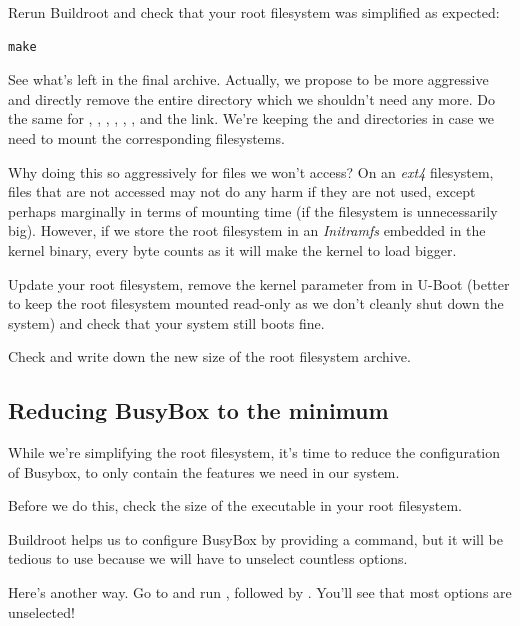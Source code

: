 Rerun Buildroot and check that your root filesystem was simplified as
expected:

\begin{verbatim}
make
\end{verbatim}

See what's left in the final archive. Actually, we propose to be more
aggressive and directly remove the entire  directory which we
shouldn't need any more. Do the same for , ,
, , , ,  and
the  link. We're keeping the  and 
directories in case we need to mount the corresponding filesystems.

Why doing this so aggressively for files we won't access? On an {\em
ext4} filesystem, files that are not accessed may not do any harm if
they are not used, except perhaps marginally in terms of mounting time
(if the filesystem is unnecessarily big). However, if we store the root
filesystem in an {\em Initramfs} embedded in the kernel binary,
every byte counts as it will make the kernel to load bigger.

Update your root filesystem, remove the  kernel parameter from
 in U-Boot (better to keep the root filesystem mounted read-only as we don't
cleanly shut down the system) and check that your system still boots fine.

Check and write down the new size of the root filesystem archive.

\subsection{Reducing BusyBox to the minimum}

While we're simplifying the root filesystem, it's time to reduce the
configuration of Busybox, to only contain the features we need in our
system.

Before we do this, check the size of the  executable in
your root filesystem.

Buildroot helps us to configure BusyBox by providing a  command, but it will be tedious to use because we
will have to unselect countless options.

Here's another way. Go to  and run
, followed by . You'll see
that most options are unselected!

